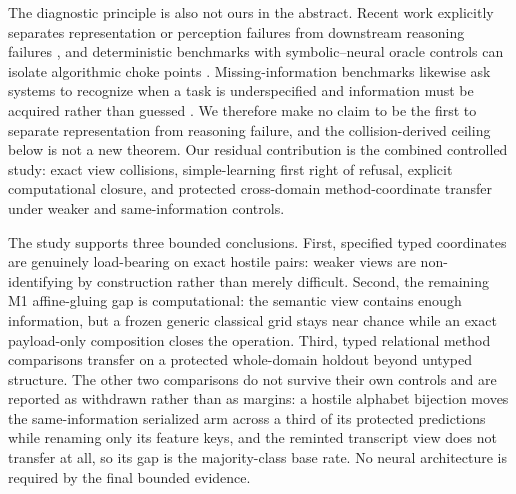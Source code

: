 The diagnostic principle is also not ours in the abstract. Recent work explicitly separates representation or perception failures from downstream reasoning failures \citep{liem2026temporal}, and deterministic benchmarks with symbolic--neural oracle controls can isolate algorithmic choke points \citep{anonymous2026chokepoints}. Missing-information benchmarks likewise ask systems to recognize when a task is underspecified and information must be acquired rather than guessed \citep{li2025questbench}. We therefore make no claim to be the first to separate representation from reasoning failure, and the collision-derived ceiling below is not a new theorem. Our residual contribution is the combined controlled study: exact view collisions, simple-learning first right of refusal, explicit computational closure, and protected cross-domain method-coordinate transfer under weaker and same-information controls.

The study supports three bounded conclusions. First, specified typed coordinates are genuinely load-bearing on exact hostile pairs: weaker views are non-identifying by construction rather than merely difficult. Second, the remaining M1 affine-gluing gap is computational: the semantic view contains enough information, but a frozen generic classical grid stays near chance while an exact payload-only composition closes the operation. Third, typed relational method comparisons transfer on a protected whole-domain holdout beyond untyped structure. The other two comparisons do not survive their own controls and are reported as withdrawn rather than as margins: a hostile alphabet bijection moves the same-information serialized arm across a third of its protected predictions while renaming only its feature keys, and the reminted transcript view does not transfer at all, so its gap is the majority-class base rate. No neural architecture is required by the final bounded evidence.

